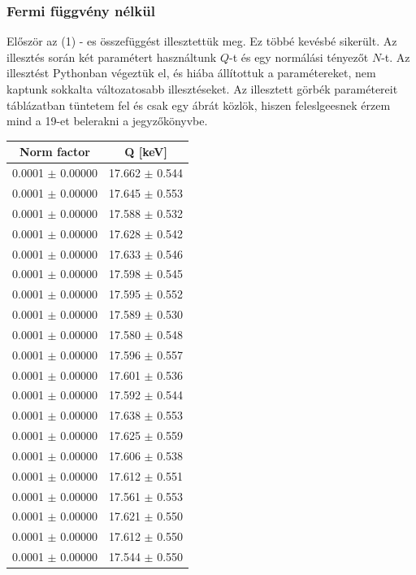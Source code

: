 \documentclass[12pt,a4paper]{article}
\theoremstyle{plain}
\begin{document}
\subsubsection{Fermi függvény nélkül}

\par Először az (1) - es összefüggést illesztettük meg. Ez többé kevésbé sikerült.
Az illesztés során két paramétert használtunk $Q$-t és egy normálási tényezőt
$N$-t. Az illesztést Pythonban végeztük el, és hiába állítottuk a paramétereket,
nem kaptunk sokkalta változatosabb illesztéseket. Az illesztett görbék
paramétereit táblázatban tüntetem fel és csak egy ábrát közlök, hiszen
feleslgeesnek érzem mind a 19-et belerakni a jegyzőkönyvbe.

\vspace{0.2cm}

\begin{table}[H]
	\centering
	\begin{tabular}{|c|c|} \hline
		Norm factor          & Q [keV]            \\ \hline
		0.0001 $\pm$ 0.00000 & 17.662 $\pm$ 0.544 \\ \hline
		0.0001 $\pm$ 0.00000 & 17.645 $\pm$ 0.553 \\ \hline
		0.0001 $\pm$ 0.00000 & 17.588 $\pm$ 0.532 \\ \hline
		0.0001 $\pm$ 0.00000 & 17.628 $\pm$ 0.542 \\ \hline
		0.0001 $\pm$ 0.00000 & 17.633 $\pm$ 0.546 \\ \hline
		0.0001 $\pm$ 0.00000 & 17.598 $\pm$ 0.545 \\ \hline
		0.0001 $\pm$ 0.00000 & 17.595 $\pm$ 0.552 \\ \hline
		0.0001 $\pm$ 0.00000 & 17.589 $\pm$ 0.530 \\ \hline
		0.0001 $\pm$ 0.00000 & 17.580 $\pm$ 0.548 \\ \hline
		0.0001 $\pm$ 0.00000 & 17.596 $\pm$ 0.557 \\ \hline
		0.0001 $\pm$ 0.00000 & 17.601 $\pm$ 0.536 \\ \hline
		0.0001 $\pm$ 0.00000 & 17.592 $\pm$ 0.544 \\ \hline
		0.0001 $\pm$ 0.00000 & 17.638 $\pm$ 0.553 \\ \hline
		0.0001 $\pm$ 0.00000 & 17.625 $\pm$ 0.559 \\ \hline
		0.0001 $\pm$ 0.00000 & 17.606 $\pm$ 0.538 \\ \hline
		0.0001 $\pm$ 0.00000 & 17.612 $\pm$ 0.551 \\ \hline
		0.0001 $\pm$ 0.00000 & 17.561 $\pm$ 0.553 \\ \hline
		0.0001 $\pm$ 0.00000 & 17.621 $\pm$ 0.550 \\ \hline
		0.0001 $\pm$ 0.00000 & 17.612 $\pm$ 0.550 \\ \hline
		0.0001 $\pm$ 0.00000 & 17.544 $\pm$ 0.550 \\ \hline
	\end{tabular}
\end{table}
\end{document}
